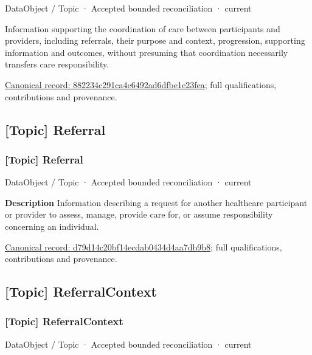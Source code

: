 \label{element:882234c291ca4c6492ad6dfbe1e23fea}
{\small DataObject / Topic · Accepted bounded reconciliation · current}\par

Information supporting the coordination of care between participants and providers, including referrals, their purpose and context, progression, supporting information and outcomes, without presuming that coordination necessarily transfers care responsibility.


{\footnotesize \href{../../../../continuum/application/data-object/topic/882234c291ca4c6492ad6dfbe1e23fea.md}{Canonical record: 882234c291ca4c6492ad6dfbe1e23fea}; full qualifications, contributions and provenance.}\par
\subsection{[Topic] Referral}

\subsubsection{[Topic] Referral}

\label{element:d79d14c20bf14ecdab0434d4aa7db9b8}
{\small DataObject / Topic · Accepted bounded reconciliation · current}\par

\textbf{Description}
Information describing a request for another healthcare participant or provider to assess, manage, provide care for, or assume responsibility concerning an individual.


{\footnotesize \href{../../../../continuum/application/data-object/topic/d79d14c20bf14ecdab0434d4aa7db9b8.md}{Canonical record: d79d14c20bf14ecdab0434d4aa7db9b8}; full qualifications, contributions and provenance.}\par
\subsection{[Topic] ReferralContext}

\subsubsection{[Topic] ReferralContext}

\label{element:9eb5906e93ca4625bdb675a3397c4c8d}
{\small DataObject / Topic · Accepted bounded reconciliation · current}\par

